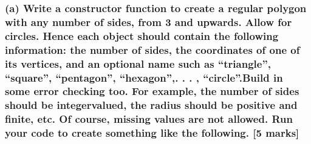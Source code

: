 \documentclass[]{article}
\begin{document}
\subsubsection{\texorpdfstring{(a) Write a constructor function to
create a regular polygon with any number of sides, from 3 and upwards.
Allow for circles. Hence each object should contain the following
information: the number of sides, the coordinates of one of its
vertices, and an optional name such as ``triangle'', ``square'',
``pentagon'', ``hexagon'',. . . , ``circle''.Build in some error
checking too. For example, the number of sides should be integervalued,
the radius should be positive and finite, etc. Of course, missing values
are not allowed. Run your code to create something like the following.
{[}5
marks{]}}{(a) Write a constructor function to create a regular polygon with any number of sides, from 3 and upwards. Allow for circles. Hence each object should contain the following information: the number of sides, the coordinates of one of its vertices, and an optional name such as triangle, square, pentagon, hexagon,. . . , circle.Build in some error checking too. For example, the number of sides should be integervalued, the radius should be positive and finite, etc. Of course, missing values are not allowed. Run your code to create something like the following. {[}5 marks{]}}}\label{a-write-a-constructor-function-to-create-a-regular-polygon-with-any-number-of-sides-from-3-and-upwards.-allow-for-circles.-hence-each-object-should-contain-the-following-information-the-number-of-sides-the-coordinates-of-one-of-its-vertices-and-an-optional-name-such-as-triangle-square-pentagon-hexagon.-.-.-circle.build-in-some-error-checking-too.-for-example-the-number-of-sides-should-be-integervalued-the-radius-should-be-positive-and-finite-etc.-of-course-missing-values-are-not-allowed.-run-your-code-to-create-something-like-the-following.-5-marks}
\end{document}
